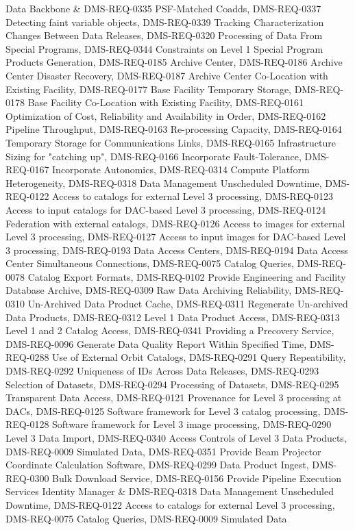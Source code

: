 Data Backbone & DMS-REQ-0335 PSF-Matched Coadds, DMS-REQ-0337 Detecting faint variable objects, DMS-REQ-0339 Tracking Characterization Changes Between Data Releases, DMS-REQ-0320 Processing of Data From Special Programs, DMS-REQ-0344 Constraints on Level 1 Special Program Products Generation, DMS-REQ-0185 Archive Center, DMS-REQ-0186 Archive Center Disaster Recovery, DMS-REQ-0187 Archive Center Co-Location with Existing Facility, DMS-REQ-0177 Base Facility Temporary Storage, DMS-REQ-0178 Base Facility Co-Location with Existing Facility, DMS-REQ-0161 Optimization of Cost, Reliability and Availability in Order, DMS-REQ-0162 Pipeline Throughput, DMS-REQ-0163 Re-processing Capacity, DMS-REQ-0164 Temporary Storage for Communications Links, DMS-REQ-0165 Infrastructure Sizing for "catching up", DMS-REQ-0166 Incorporate Fault-Tolerance, DMS-REQ-0167 Incorporate Autonomics, DMS-REQ-0314 Compute Platform Heterogeneity, DMS-REQ-0318 Data Management Unscheduled Downtime, DMS-REQ-0122 Access to catalogs for external Level 3 processing, DMS-REQ-0123 Access to input catalogs for DAC-based Level 3 processing, DMS-REQ-0124 Federation with external catalogs, DMS-REQ-0126 Access to images for external Level 3 processing, DMS-REQ-0127 Access to input images for DAC-based Level 3 processing, DMS-REQ-0193 Data Access Centers, DMS-REQ-0194 Data Access Center Simultaneous Connections, DMS-REQ-0075 Catalog Queries, DMS-REQ-0078 Catalog Export Formats, DMS-REQ-0102 Provide Engineering and Facility Database Archive, DMS-REQ-0309 Raw Data Archiving Reliability, DMS-REQ-0310 Un-Archived Data Product Cache, DMS-REQ-0311 Regenerate Un-archived Data Products, DMS-REQ-0312 Level 1 Data Product Access, DMS-REQ-0313 Level 1 and 2 Catalog Access, DMS-REQ-0341 Providing a Precovery Service, DMS-REQ-0096 Generate Data Quality Report Within Specified Time, DMS-REQ-0288 Use of External Orbit Catalogs, DMS-REQ-0291 Query Repeatibility, DMS-REQ-0292 Uniqueness of IDs Across Data Releases, DMS-REQ-0293 Selection of Datasets, DMS-REQ-0294 Processing of Datasets, DMS-REQ-0295 Transparent Data Access, DMS-REQ-0121 Provenance for Level 3 processing at DACs, DMS-REQ-0125 Software framework for Level 3 catalog processing, DMS-REQ-0128 Software framework for Level 3 image processing, DMS-REQ-0290 Level 3 Data Import, DMS-REQ-0340 Access Controls of Level 3 Data Products, DMS-REQ-0009 Simulated Data, DMS-REQ-0351 Provide Beam Projector Coordinate Calculation Software, DMS-REQ-0299 Data Product Ingest, DMS-REQ-0300 Bulk Download Service, DMS-REQ-0156 Provide Pipeline Execution Services
Identity Manager & DMS-REQ-0318 Data Management Unscheduled Downtime, DMS-REQ-0122 Access to catalogs for external Level 3 processing, DMS-REQ-0075 Catalog Queries, DMS-REQ-0009 Simulated Data
